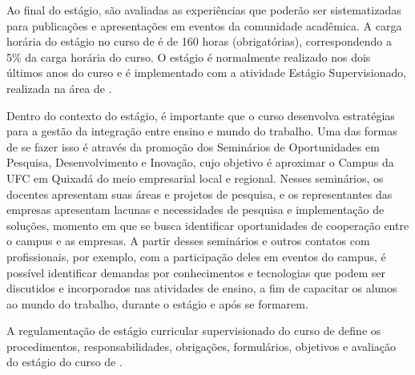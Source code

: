 Ao final do estágio, são avaliadas as experiências que poderão ser sistematizadas para publicações e apresentações em eventos da comunidade acadêmica. A carga horária do estágio no curso de \nomedocurso é de 160 horas (obrigatórias), correspondendo a 5\% da carga horária do curso. O estágio é normalmente realizado nos dois últimos anos do curso e é implementado com a atividade Estágio Supervisionado, realizada na área de \nomedocurso.


Dentro do contexto do estágio, é importante que o curso desenvolva estratégias para a gestão da integração entre ensino e mundo do trabalho. Uma das formas de se fazer isso é através da promoção dos Seminários de Oportunidades em Pesquisa, Desenvolvimento e Inovação, cujo objetivo é aproximar o Campus da UFC em Quixadá do meio empresarial local e regional. Nesses seminários, os docentes apresentam suas áreas e projetos de pesquisa, e os representantes das empresas apresentam lacunas e necessidades de pesquisa e implementação de soluções, momento em que se busca identificar oportunidades de cooperação entre o campus e as empresas. A partir desses seminários e outros contatos com profissionais, por exemplo, com a participação deles em eventos do campus, é possível identificar demandas por conhecimentos e tecnologias que podem ser discutidos e incorporados nas atividades de ensino, a fim de capacitar os alunos ao mundo do trabalho, durante o estágio e após se formarem.

A regulamentação de estágio curricular supervisionado do curso de \nomedocurso define os procedimentos, responsabilidades, obrigações, formulários, objetivos e avaliação do estágio do curso de \nomedocurso.

